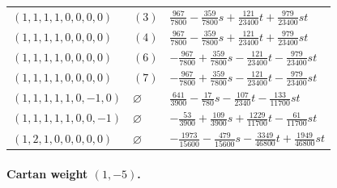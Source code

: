 \begin{longtable}{@{}lll@{}}
$(1,1,1,1,0,0,0,0)$ & $(3)$ & $\frac{967}{7800}-\frac{359}{7800}s+\allowbreak \frac{121}{23400}t+\allowbreak \frac{979}{23400}st$\\
$(1,1,1,1,0,0,0,0)$ & $(4)$ & $\frac{967}{7800}-\frac{359}{7800}s+\allowbreak \frac{121}{23400}t+\allowbreak \frac{979}{23400}st$\\
$(1,1,1,1,0,0,0,0)$ & $(6)$ & $-\frac{967}{7800}+\allowbreak \frac{359}{7800}s-\frac{121}{23400}t-\frac{979}{23400}st$\\
$(1,1,1,1,0,0,0,0)$ & $(7)$ & $-\frac{967}{7800}+\allowbreak \frac{359}{7800}s-\frac{121}{23400}t-\frac{979}{23400}st$\\
$(1,1,1,1,1,0,-1,0)$ & $\varnothing$ & $\frac{641}{3900}-\frac{17}{780}s-\frac{107}{2340}t-\frac{133}{11700}st$\\
$(1,1,1,1,1,0,0,-1)$ & $\varnothing$ & $-\frac{53}{3900}+\allowbreak \frac{109}{3900}s+\allowbreak \frac{1229}{11700}t-\frac{61}{11700}st$\\
$(1,2,1,0,0,0,0,0)$ & $\varnothing$ & $-\frac{1973}{15600}-\frac{479}{15600}s-\frac{3349}{46800}t+\allowbreak \frac{1949}{46800}st$\\
\end{longtable}
\endgroup
\paragraph{Cartan weight $(1,-5)$.}

